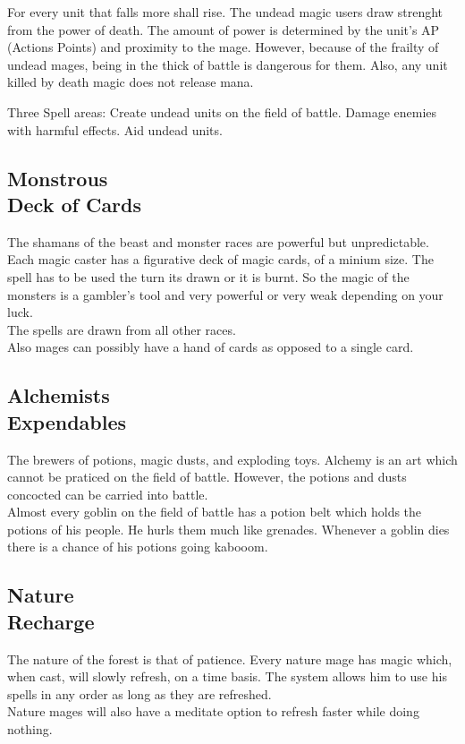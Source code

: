 \documentclass[a4paper,twocolumn]{article}
\begin{document}
For every unit that falls more shall rise. The undead magic users draw strenght from the power of death. The amount of power is determined by the unit's AP (Actions Points) and proximity to the mage. However, because of the frailty of undead mages, being in the thick of battle is dangerous for them. Also, any unit killed by death magic does not release mana.

Three Spell areas:
Create undead units on the field of battle.
Damage enemies with harmful effects.
Aid undead units.

\subsection{Monstrous \\Deck of Cards}

The shamans of the beast and monster races are powerful but unpredictable. Each magic caster has a figurative deck of magic cards, of a minium size. The spell has to be used the turn its drawn or it is burnt. So the magic of the monsters is a gambler's tool and very powerful or very weak depending on your luck.\\
The spells are drawn from all other races.\\
Also mages can possibly have a hand of cards as opposed to a single card.

\subsection{Alchemists \\ Expendables}

The brewers of potions, magic dusts, and exploding toys. Alchemy is an art which cannot be praticed on the field of battle. However, the potions and dusts concocted can be carried into battle.\\
Almost every goblin on the field of battle has a potion belt which holds the potions of his people. He hurls them much like grenades. Whenever a goblin dies there is a chance of his potions going kabooom.

\subsection{Nature \\ Recharge}

The nature of the forest is that of patience. Every nature mage has magic which, when cast, will slowly refresh, on a time basis. The system allows him to use his spells in any order as long as they are refreshed.\\
Nature mages will also have a meditate option to refresh faster while doing nothing.
\end{document}
